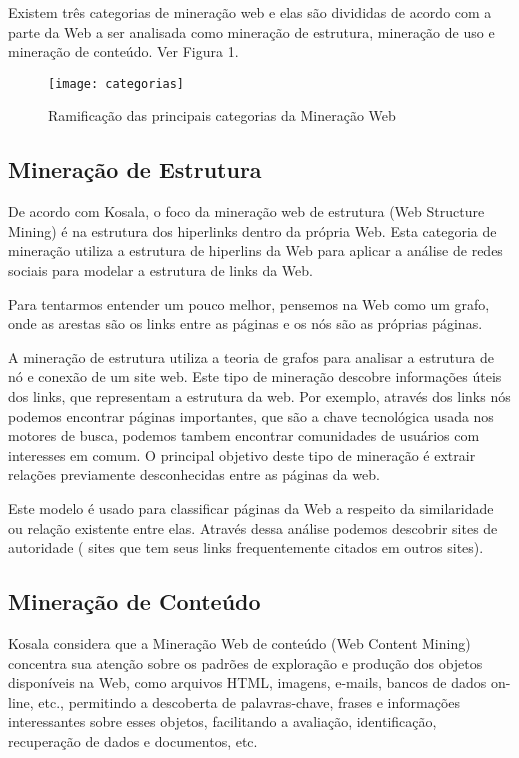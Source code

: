 	Existem três categorias de mineração web e elas são divididas de acordo com a parte da Web a ser analisada como mineração de estrutura, mineração de uso e mineração de conteúdo. Ver Figura 1.

\begin{figure}[!htb]
\centering
\texttt{[image: categorias]}
\caption{Ramificação das principais categorias da Mineração Web}
\label{Rotulo}
\end{figure}

\subsection{Mineração de Estrutura}

	De acordo com Kosala\cite{Kosala}, o foco da mineração web de estrutura (Web Structure Mining) é na estrutura dos hiperlinks dentro da própria Web. Esta categoria de mineração utiliza a estrutura de hiperlins da Web para aplicar a análise de redes sociais para modelar a estrutura de links da Web.

	Para tentarmos entender um pouco melhor, pensemos na Web como um grafo, onde as arestas são os links entre as páginas e os nós são as próprias páginas.

	A mineração de estrutura utiliza a teoria de grafos para analisar a estrutura de nó e conexão  de um site web. Este tipo de mineração descobre informações úteis dos links, que representam a estrutura da web. Por exemplo, através dos links nós podemos encontrar páginas importantes, que são a chave tecnológica usada nos motores de busca, podemos tambem encontrar comunidades de usuários com interesses em comum. O principal objetivo deste tipo de mineração é extrair relações previamente desconhecidas entre as páginas da web.

	Este modelo é usado para classificar páginas da Web a respeito da similaridade ou relação existente entre elas. Através dessa análise podemos descobrir sites de autoridade ( sites que tem seus links frequentemente citados em outros sites).

\subsection{Mineração de Conteúdo}
    Kosala\cite{Kosala} considera que a Mineração Web de conteúdo (Web Content Mining) concentra sua atenção sobre os padrões de exploração e produção dos objetos disponíveis na Web, como arquivos HTML, imagens, e-mails, bancos de dados on-line, etc., permitindo a descoberta de palavras-chave, frases e informações interessantes sobre esses objetos, facilitando a avaliação, identificação, recuperação de dados e documentos, etc.


